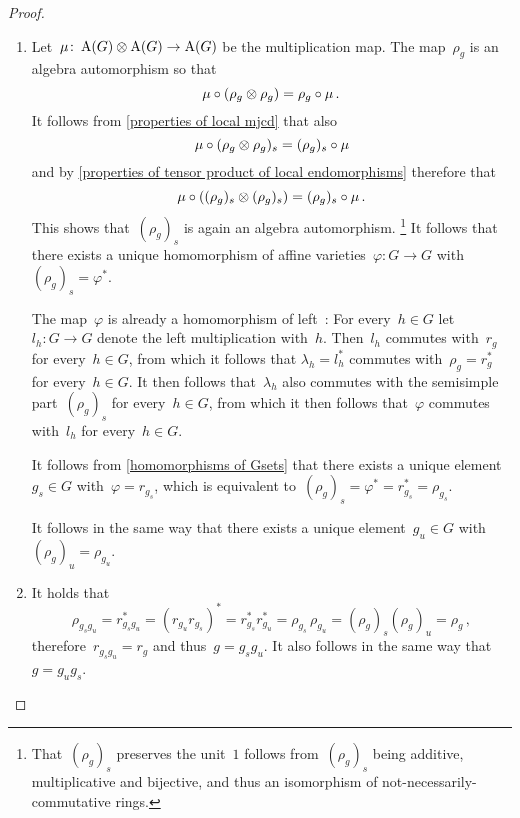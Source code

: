 \begin{proof}
  \leavevmode
  \begin{enumerate}
    \item
      Let~$\mu \colon \operatorname{A}(G) \otimes \operatorname{A}(G) \to \operatorname{A}(G)$ be the multiplication map.
      The map~$\rho_g$ is an algebra automorphism so that
      \[
          \mu \circ ( \rho_g \otimes \rho_g )
        = \rho_g \circ \mu \,.
      \]
      It follows from \cref{properties of local mjcd} that also
      \[
          \mu \circ ( \rho_g \otimes \rho_g )_s
        = ( \rho_g )_s \circ \mu
      \]
      and by \cref{properties of tensor product of local endomorphisms} therefore that
      \[
          \mu \circ \left( (\rho_g)_s \otimes (\rho_g)_s \right)
        = ( \rho_g )_s \circ \mu \,.
      \]
      This shows that~$(\rho_g)_s$ is again an algebra automorphism.%
      \footnote{That~$(\rho_g)_s$ preserves the unit~$1$ follows from~$(\rho_g)_s$ being additive, multiplicative and bijective, and thus an isomorphism of not\nobreakdash-necessarily\nobreakdash-commutative rings.}
      It follows that there exists a unique homomorphism of affine varieties~$\varphi \colon G \to G$ with~$(\rho_g)_s = \varphi^*$.
      
      The map~$\varphi$ is already a homomorphism of left~:
      For every~$h \in G$ let~$l_h \colon G \to G$ denote the left multiplication with~$h$.
      Then~$l_h$ commutes with~$r_g$ for every~$h \in G$, from which it follows that $\lambda_h = l_h^*$ commutes with~$\rho_g = r_g^*$ for every~$h \in G$.
      It then follows that~$\lambda_h$ also commutes with the semisimple part~$(\rho_g)_s$ for every~$h \in G$, from which it then follows that~$\varphi$ commutes with~$l_h$ for every~$h \in G$.
      
      It follows from \cref{homomorphisms of Gsets} that there exists a unique element~$g_s \in G$ with~$\varphi = r_{g_s}$, which is equivalent to~$(\rho_g)_s = \varphi^* = r_{g_s}^* = \rho_{g_s}$.
      
      It follows in the same way that there exists a unique element~$g_u \in G$ with~$(\rho_g)_u = \rho_{g_u}$.
    \item
      It holds that
      \[
          \rho_{g_s g_u}
        = r_{g_s g_u}^*
        = (r_{g_u} r_{g_s})^*
        = r_{g_s}^* r_{g_u}^*
        = \rho_{g_s} \, \rho_{g_u}
        = (\rho_g)_s (\rho_g)_u
        = \rho_{g} \,,
      \]
      therefore~$r_{g_s g_u} = r_g$ and thus~$g = g_s g_u$.
      It also follows in the same way that~$g = g_u g_s$.
  \end{enumerate}
\end{proof}


